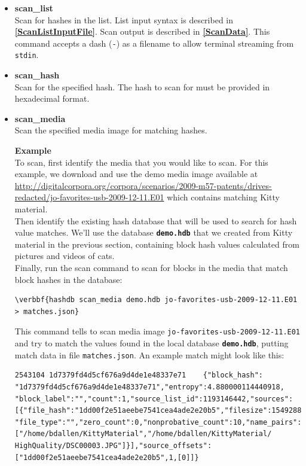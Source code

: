 \documentclass[11pt,fleqn]{article} %
\begin{document}
\begin{itemize}
\item \textbf{scan\_list}\\
Scan for hashes in the list. List input syntax is described in \textbf{\autoref{ScanListInputFile}}. Scan output is described in \textbf{\autoref{ScanData}}. This command accepts a dash (\verb+-+) as a filename to allow terminal streaming from \verb+stdin+.\\
\item \textbf{scan\_hash}\\
Scan for the specified hash. The hash to scan for must be provided in hexadecimal format.
\item \textbf{scan\_media}\\
Scan the specified media image for matching hashes.

\textbf{Example}\\
To scan, first identify the media that you would like to scan. For this example, we download and use the demo media image available at \url{ http://digitalcorpora.org/corpora/scenarios/2009-m57-patents/drives-redacted/jo-favorites-usb-2009-12-11.E01} which contains matching Kitty material.\\

Then identify the existing hash database that will be used to search for hash value matches. We'll use the database \texttt{\textbf{demo.hdb}} that we created from Kitty material in the previous section, containing block hash values calculated from pictures and videos of cats.\\

Finally, run the \hdb scan command to scan for blocks in the media that match block hashes in the database:
\begin{Verbatim}[commandchars=\\\{\}]
\verbbf{hashdb scan_media demo.hdb jo-favorites-usb-2009-12-11.E01 > matches.json}
\end{Verbatim}
This command tells \hdb to scan media image \verb+jo-favorites-usb-2009-12-11.E01+ and try to match the values found in the local database \texttt{\textbf{demo.hdb}}, putting match data in file \verb+matches.json+.  An example match might look like this:

\begingroup
\footnotesize
\begin{Verbatim}[fontfamily=courier]
2543104	1d7379fd4d5cf676a9d4de1e48337e71	{"block_hash":
"1d7379fd4d5cf676a9d4de1e48337e71","entropy":4.880000114440918,
"block_label":"","count":1,"source_list_id":1193146442,"sources":
[{"file_hash":"1dd00f2e51aeebe7541cea4ade2e20b5","filesize":1549288,
"file_type":"","zero_count":0,"nonprobative_count":10,"name_pairs":
["/home/bdallen/KittyMaterial","/home/bdallen/KittyMaterial/
HighQuality/DSC00003.JPG"]}],"source_offsets":
["1dd00f2e51aeebe7541cea4ade2e20b5",1,[0]]}
\end{Verbatim}
\endgroup


\end{itemize}
\end{document}

